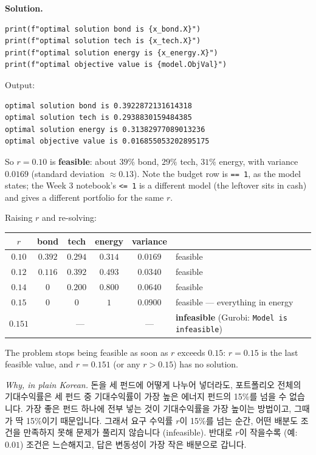 \documentclass[10pt]{article}
\newenvironment{solution}
  {\par\smallskip\begingroup\color{solink}\textbf{Solution.}\ }
  {\endgroup\par}
\begin{document}
\begin{parts}
\begin{solution}
\begin{lstlisting}
print(f"optimal solution bond is {x_bond.X}")
print(f"optimal solution tech is {x_tech.X}")
print(f"optimal solution energy is {x_energy.X}")
print(f"optimal objective value is {model.ObjVal}")
\end{lstlisting}
Output:
\begin{lstlisting}
optimal solution bond is 0.3922872131614318
optimal solution tech is 0.2938830159484385
optimal solution energy is 0.31382977089013236
optimal objective value is 0.016855053202895175
\end{lstlisting}
So $r = 0.10$ is \textbf{feasible}: about $39\%$ bond, $29\%$ tech, $31\%$ energy, with
variance $0.0169$ (standard deviation $\approx 0.13$). Note the budget row is
\texttt{==\,1}, as the model states; the Week 3 notebook's \texttt{<=\,1} is a different
model (the leftover sits in cash) and gives a different portfolio for the same $r$.
\par\smallskip
Raising $r$ and re-solving:
\begin{center}
\begin{tabular}{c|ccc|c|l}
 $r$ & bond & tech & energy & variance & \\ \hline
 $0.10$  & $0.392$ & $0.294$ & $0.314$ & $0.0169$ & feasible \\
 $0.12$  & $0.116$ & $0.392$ & $0.493$ & $0.0340$ & feasible \\
 $0.14$  & $0$     & $0.200$ & $0.800$ & $0.0640$ & feasible \\
 $0.15$  & $0$     & $0$     & $1$     & $0.0900$ & feasible --- everything in energy \\
 $0.151$ & \multicolumn{3}{c|}{---} & --- & \textbf{infeasible} (Gurobi: \texttt{Model is infeasible}) \\
\end{tabular}
\end{center}
The problem stops being feasible as soon as $r$ exceeds $0.15$: $r = 0.15$ is the last
feasible value, and $r = 0.151$ (or any $r > 0.15$) has no solution.
\par\smallskip
\emph{Why, in plain Korean.}
돈을 세 펀드에 어떻게 나누어 넣더라도, 포트폴리오 전체의 기대수익률은 세 펀드 중 기대수익률이
가장 높은 에너지 펀드의 15\%를 넘을 수 없습니다. 가장 좋은 펀드 하나에 전부 넣는 것이 기대수익률을
가장 높이는 방법이고, 그때가 딱 15\%이기 때문입니다. 그래서 요구 수익률 $r$이 15\%를 넘는 순간, 어떤
배분도 조건을 만족하지 못해 문제가 풀리지 않습니다 (infeasible). 반대로 $r$이 작을수록 (예: $0.01$)
조건은 느슨해지고, 답은 변동성이 가장 작은 배분으로 갑니다.
\end{solution}


\end{parts}
\end{document}
